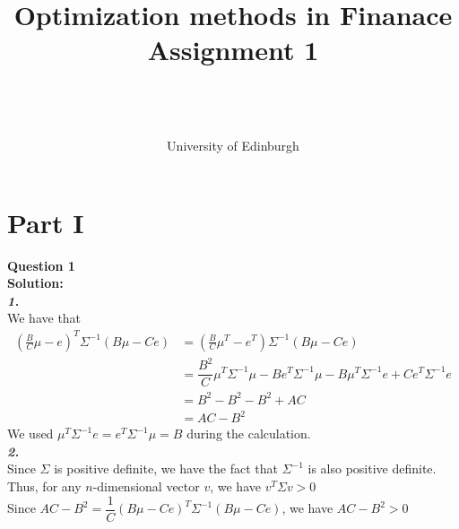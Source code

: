 \documentclass[11pt,a4paper]{article}
\title{Optimization methods in Finanace \\ Assignment 1}
\author{\StudentName\\ \StudentNumber \\ \phantom{} \\ University of Edinburgh }
\begin{document}
\maketitle
\section{Part I}
\textbf{Question 1}\\
\textbf{Solution:}\\
\textit{\textbf{1.}}\\
We have that $$\begin{aligned}
\left(\frac{B}{C} \mu-e\right)^{T} \Sigma^{-1}(B \mu-C e)&=\left(\frac{B}{C} \mu^{T}-e^{T}\right) \Sigma^{-1}(B \mu-C e)\\ &=\dfrac{B^{2}}{C}\mu^{T}\Sigma^{-1}\mu-Be^{T}\Sigma^{-1}\mu-B\mu^{T}\Sigma^{-1}e+Ce^{T}\Sigma^{-1}e\\&=B^{2}-B^{2}-B^{2}+AC\\&=AC-B^{2}
\end{aligned}
$$
We used $\mu^{T}\Sigma^{-1}e=e^{T}\Sigma^{-1}\mu=B$ during the calculation.\\


\textit{\textbf{2.}}\\
Since $\Sigma$ is positive definite, we have the fact that $\Sigma^{-1}$ is also positive definite.\\ Thus, for any $n$-dimensional vector $v$, we have $v^{T}\Sigma v>0$\\ Since $AC-B^{2}=\dfrac{1}{C}\left(B \mu-Ce\right)^{T} \Sigma^{-1}(B \mu-C e)$, we have $AC-B^{2}>0$\\
\end{document}
